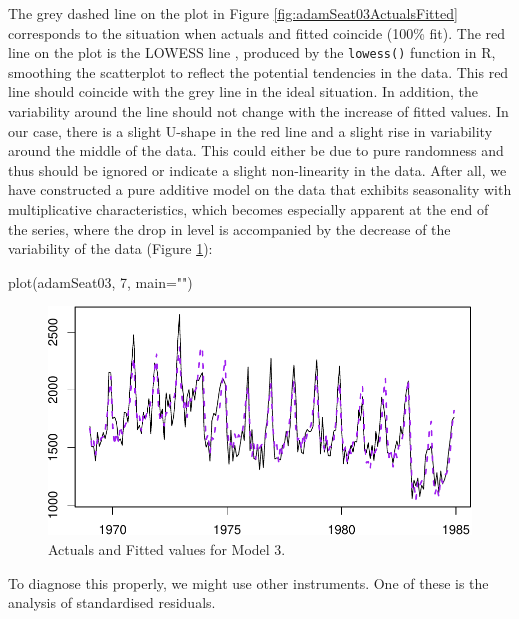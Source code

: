 \documentclass[
]{book}
\newenvironment{Shaded}{\begin{snugshade}}{\end{snugshade}}
\newcommand{\AttributeTok}[1]{\textcolor[rgb]{0.77,0.63,0.00}{#1}}
\newcommand{\DecValTok}[1]{\textcolor[rgb]{0.00,0.00,0.81}{#1}}
\newcommand{\FunctionTok}[1]{\textcolor[rgb]{0.00,0.00,0.00}{#1}}
\newcommand{\NormalTok}[1]{#1}
\newcommand{\StringTok}[1]{\textcolor[rgb]{0.31,0.60,0.02}{#1}}
\theoremstyle{definition}
\theoremstyle{definition}
\theoremstyle{definition}
\theoremstyle{definition}
\theoremstyle{remark}
\begin{document}
The grey dashed line on the plot in Figure \ref{fig:adamSeat03ActualsFitted} corresponds to the situation when actuals and fitted coincide (100\% fit). The red line on the plot is the LOWESS line \citep{Cleveland1979}, produced by the \texttt{lowess()} function in R, smoothing the scatterplot to reflect the potential tendencies in the data. This red line should coincide with the grey line in the ideal situation. In addition, the variability around the line should not change with the increase of fitted values. In our case, there is a slight U-shape in the red line and a slight rise in variability around the middle of the data. This could either be due to pure randomness and thus should be ignored or indicate a slight non-linearity in the data. After all, we have constructed a pure additive model on the data that exhibits seasonality with multiplicative characteristics, which becomes especially apparent at the end of the series, where the drop in level is accompanied by the decrease of the variability of the data (Figure \ref{fig:adamSeat03LinearPlot}):

\begin{Shaded}
\begin{Highlighting}[]
\FunctionTok{plot}\NormalTok{(adamSeat03, }\DecValTok{7}\NormalTok{, }\AttributeTok{main=}\StringTok{""}\NormalTok{)}
\end{Highlighting}
\end{Shaded}

\begin{figure}
\centering
\includegraphics{Svetunkov--2022----ADAM_files/figure-latex/adamSeat03LinearPlot-1.pdf}
\caption{\label{fig:adamSeat03LinearPlot}Actuals and Fitted values for Model 3.}
\end{figure}

To diagnose this properly, we might use other instruments. One of these is the analysis of standardised residuals.
\end{document}
